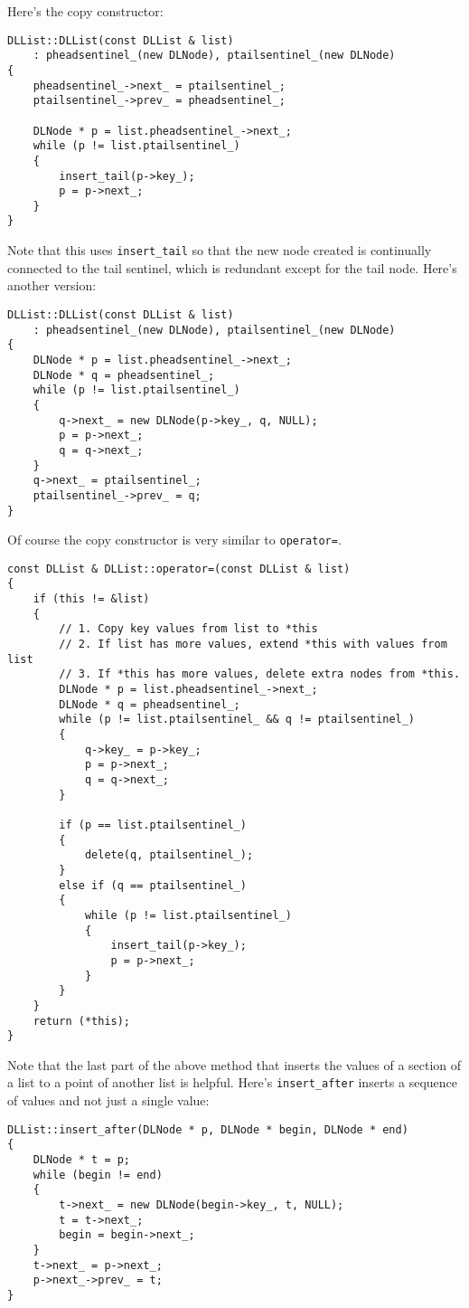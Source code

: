 Here's the copy constructor:
\begin{Verbatim}[frame=single,fontsize=\footnotesize]
DLList::DLList(const DLList & list)
    : pheadsentinel_(new DLNode), ptailsentinel_(new DLNode)
{
    pheadsentinel_->next_ = ptailsentinel_;
    ptailsentinel_->prev_ = pheadsentinel_;

    DLNode * p = list.pheadsentinel_->next_;
    while (p != list.ptailsentinel_)
    {
        insert_tail(p->key_);
        p = p->next_;
    }
}
\end{Verbatim}
Note that this uses \verb!insert_tail! so that the new node created
is continually connected to the tail sentinel, which is redundant
except for the tail node.
Here's another version:
\begin{Verbatim}[frame=single,fontsize=\footnotesize]
DLList::DLList(const DLList & list)
    : pheadsentinel_(new DLNode), ptailsentinel_(new DLNode)
{
    DLNode * p = list.pheadsentinel_->next_;
    DLNode * q = pheadsentinel_;
    while (p != list.ptailsentinel_)
    {
        q->next_ = new DLNode(p->key_, q, NULL);
        p = p->next_;
        q = q->next_;
    }
    q->next_ = ptailsentinel_;
    ptailsentinel_->prev_ = q;
}
\end{Verbatim}
Of course the copy constructor is very similar to \verb!operator=!.
\begin{Verbatim}[frame=single,fontsize=\footnotesize]
const DLList & DLList::operator=(const DLList & list)
{
    if (this != &list)
    {
        // 1. Copy key values from list to *this
        // 2. If list has more values, extend *this with values from list
        // 3. If *this has more values, delete extra nodes from *this.
        DLNode * p = list.pheadsentinel_->next_;
        DLNode * q = pheadsentinel_;
        while (p != list.ptailsentinel_ && q != ptailsentinel_)
        {
            q->key_ = p->key_;
            p = p->next_;
            q = q->next_;
        }

        if (p == list.ptailsentinel_)
        {
            delete(q, ptailsentinel_);
        }
        else if (q == ptailsentinel_)
        {
            while (p != list.ptailsentinel_)
            {
                insert_tail(p->key_);
                p = p->next_;
            }
        }
    }
    return (*this);
}
\end{Verbatim}
Note that the last part of the above method
that inserts the values of a section of a list to
a point of another list is helpful.
Here's \verb!insert_after! inserts a sequence of values and not just a single value:
\begin{Verbatim}[frame=single,fontsize=\footnotesize]
DLList::insert_after(DLNode * p, DLNode * begin, DLNode * end)
{
    DLNode * t = p;
    while (begin != end)
    {
        t->next_ = new DLNode(begin->key_, t, NULL);
        t = t->next_;
        begin = begin->next_;
    }
    t->next_ = p->next_;
    p->next_->prev_ = t;
}
\end{Verbatim}
